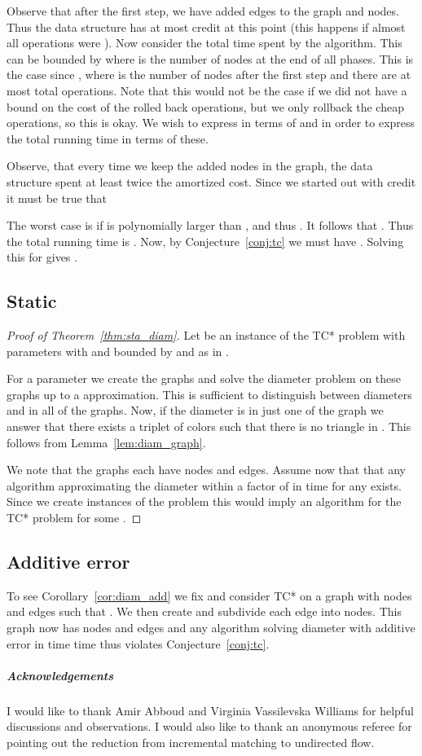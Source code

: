 \documentclass[a4paper,11pt]{article}
\theoremstyle{definition}
\begin{document}
Observe that after the first step, we have added  edges to the graph
and  nodes. Thus the data structure has at most 
credit at this point (this happens if almost all operations were ). Now
consider the total time spent by the algorithm. This can be bounded by
 where  is the number of nodes at the end of all
phases. This is the case since , where  is the number
of nodes after the first step and there are at most  total
operations. Note that this would not be the case if we did not have a bound on
the cost of the rolled back operations, but we only rollback the cheap
operations, so this is okay. We wish to express  in terms of  and
 in order to express the total running time in terms of these.

Observe, that every time we keep the added nodes in the graph, the data
structure spent at least twice the amortized cost. Since
we started out with  credit it must be true that

The worst case is if  is polynomially larger than , and thus
. It follows that .
Thus the total running time is . Now, by Conjecture~\ref{conj:tc} we must have . Solving this for  gives .


\subsection{Static}
\begin{proof}[Proof of Theorem~\ref{thm:sta_diam}]
    Let  be an instance of the TC* problem with parameters  with
     and  bounded by  and  as in
    \cite{AbboudVY15}.

    For a parameter  we
    create the graphs  and solve the diameter problem on these graphs up to a 
    approximation. This is sufficient to distinguish between diameters  and
     in all of the graphs. Now, if the diameter is  in just one of the
    graph we answer that there exists a triplet of colors such that there is no
    triangle in . This follows from Lemma~\ref{lem:diam_graph}.

    We note that the graphs  each have 
    nodes and  edges. Assume now that that any algorithm
    approximating the diameter within a factor of  in time
     for any 
    exists. Since we create  instances of the problem this would
    imply an  algorithm for the TC* problem for some .
\end{proof}

\subsection{Additive error}
To see Corollary~\ref{cor:diam_add} we fix  and consider TC* on a
graph  with  nodes and  edges such that .
We then create  and subdivide each edge into  nodes.
This graph now has  nodes and edges and any algorithm solving 
diameter with additive error  in time  time thus violates
Conjecture~\ref{conj:tc}.

\subparagraph*{Acknowledgements}
I would like to thank Amir Abboud and Virginia Vassilevska Williams for helpful
discussions and observations. I would also like to thank an anonymous referee
for pointing out the reduction from incremental matching to undirected flow.






\end{document}
